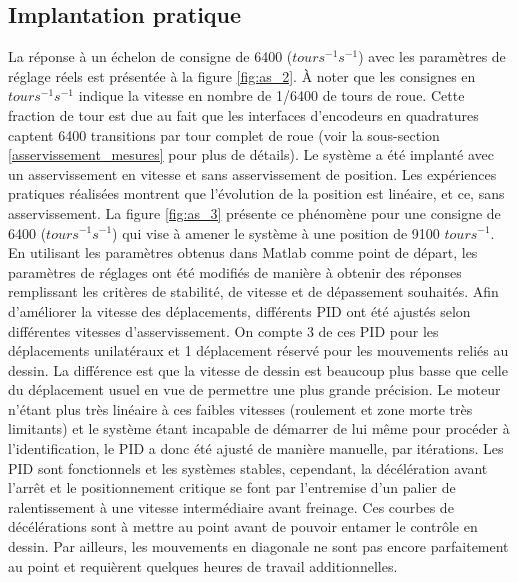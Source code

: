 \subsection{Implantation pratique}
\label{s:ass_implantation_pratique}
La réponse à un échelon de consigne de 6400 ($tours^{-1} s^{-1}$) avec les paramètres de réglage réels est présentée à la figure \ref{fig:as_2}. À noter que les consignes en $tours^{-1} s^{-1}$ indique la vitesse en nombre de 1/6400 de tours de roue. Cette fraction de tour est due au fait que les interfaces d'encodeurs en quadratures captent 6400 transitions par tour complet de roue (voir la sous-section \ref{asservissement_mesures} pour plus de détails).
Le système a été implanté avec un asservissement en vitesse et sans asservissement de position. Les expériences pratiques réalisées montrent que l'évolution de la position est linéaire, et ce, sans asservissement. La figure \ref{fig:as_3} présente ce phénomène pour une consigne de 6400 ($tours^{-1} s^{-1}$) qui vise à amener le système à une position de 9100 $tours^{-1}$.
En utilisant les paramètres obtenus dans Matlab comme point de départ, les paramètres de réglages ont été modifiés de manière à obtenir des réponses remplissant les critères de stabilité, de vitesse et de dépassement souhaités. Afin d'améliorer la vitesse des déplacements, différents PID ont été ajustés selon différentes vitesses d'asservissement. On compte 3 de ces PID pour les déplacements unilatéraux et 1 déplacement réservé pour les mouvements reliés au dessin. La différence est que la vitesse de dessin est beaucoup plus basse que celle du déplacement usuel en vue de permettre une plus grande précision. Le moteur n'étant plus très linéaire à ces faibles vitesses (roulement et zone morte très limitants) et le système étant incapable de démarrer de lui même pour procéder à l'identification, le PID a donc été ajusté de manière manuelle, par itérations. Les PID sont fonctionnels et les systèmes stables, cependant, la décélération avant l'arrêt et le positionnement critique se font par l'entremise d'un palier de ralentissement à une vitesse intermédiaire avant freinage. Ces courbes de décélérations sont à mettre au point avant de pouvoir entamer le contrôle en dessin. Par ailleurs, les mouvements en diagonale ne sont pas encore parfaitement au point et requièrent quelques heures de travail additionnelles.
